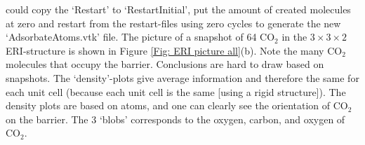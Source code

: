 could copy the `Restart' to `RestartInitial', put the amount of created molecules at zero and restart from the
restart-files using zero cycles to generate the new `AdsorbateAtoms.vtk' file.
The picture of a snapshot of 64 CO$_2$ in the $3\times3\times2$ ERI-structure is shown in
Figure \ref{Fig: ERI picture all}(b). Note the many CO$_2$ molecules that occupy the barrier. Conclusions
are hard to draw based on snapshots. The `density'-plots give average information and therefore the same for
each unit cell (because each unit cell is the same [using a rigid structure]). The density plots are based on
atoms, and one can clearly see the orientation of CO$_2$ on the barrier. The 3 `blobs' corresponds to the oxygen, carbon,
and oxygen of CO$_2$.

\begin{figure}[t]
  \centering

\end{figure}
